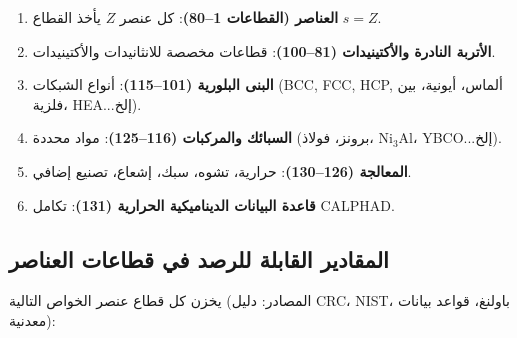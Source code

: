 \documentclass[11pt,a4paper]{article}
\begin{document}
\begin{otherlanguage}{arabic}
		\begin{enumerate}
			\item \textbf{العناصر (القطاعات 1–80)}: كل عنصر \(Z\) يأخذ القطاع \(s=Z\).
			\item \textbf{الأتربة النادرة والأكتينيدات (81–100)}: قطاعات مخصصة للانثانيدات والأكتينيدات.
			\item \textbf{البنى البلورية (101–115)}: أنواع الشبكات (BCC, FCC, HCP, ألماس، أيونية، بين فلزية، HEA...إلخ).
			\item \textbf{السبائك والمركبات (116–125)}: مواد محددة (برونز، فولاذ، Ni\(_{3}\)Al، YBCO...إلخ).
			\item \textbf{المعالجة (126–130)}: حرارية، تشوه، سبك، إشعاع، تصنيع إضافي.
			\item \textbf{قاعدة البيانات الديناميكية الحرارية (131)}: تكامل CALPHAD.
		\end{enumerate}
		
		\subsection{المقادير القابلة للرصد في قطاعات العناصر}
		
		يخزن كل قطاع عنصر الخواص التالية (المصادر: دليل CRC، NIST، باولنغ، قواعد بيانات معدنية):
		

\end{otherlanguage}
\end{document}
